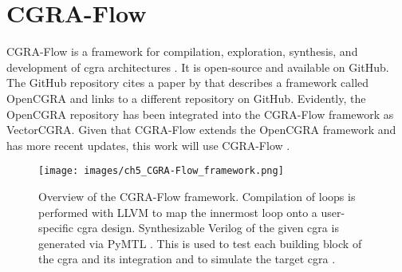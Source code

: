 \section{CGRA-Flow} \label{section:cgra-flow}
    CGRA-Flow \cite{4_OpenCGRA} is a framework for compilation, exploration, synthesis, and development of \ac{cgra} architectures \cite{cgra-flow}.
    It is open-source and available on GitHub\footnotemark. 
    The GitHub repository cites a paper by  \cite{4_OpenCGRA} that describes a framework called OpenCGRA and links to a different repository on GitHub.
    Evidently, the OpenCGRA repository has been integrated into the CGRA-Flow framework as VectorCGRA.
    Given that CGRA-Flow extends the OpenCGRA framework and has more recent updates, this work will use CGRA-Flow \cite{cgra-flow}.

    \begin{figure}[htb]
      \centering
      \texttt{[image: images/ch5\_CGRA-Flow\_framework.png]}
      \caption{%
        Overview of the CGRA-Flow framework.
        Compilation of loops is performed with LLVM \cite{LLVM} to map the innermost loop onto a user-specific \ac{cgra} design.
        Synthesizable Verilog of the given \ac{cgra} is generated via PyMTL \cite{PyMTL}.
        This is used to test each building block of the \ac{cgra} and its integration and to simulate the target \ac{cgra} \cite{4_OpenCGRA}.
      }
      \label{fig:cgra-flow_framework}
    \end{figure}

